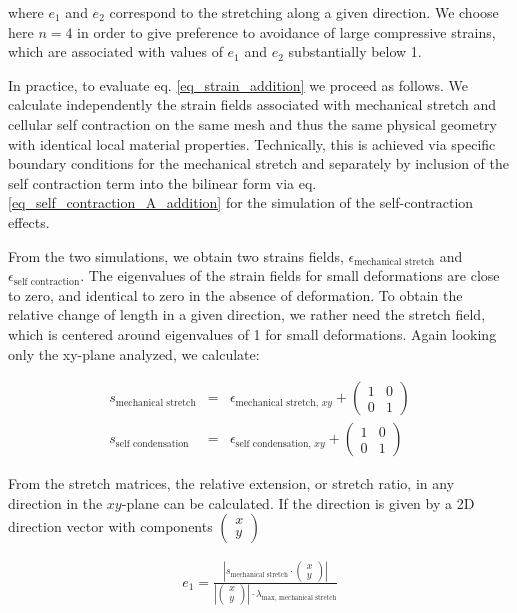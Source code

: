 \documentclass[11pt]{amsart}
\begin{document}
where $e_1$ and $e_2$ correspond to the stretching along a given direction. We choose here $n=4$ in order to give preference to avoidance of large compressive strains, which are associated with values of $e_1$ and $e_2$ substantially below 1.

In practice, to evaluate eq. \ref{eq_strain_addition} we proceed as follows. We calculate independently the strain fields associated with mechanical stretch and cellular self contraction on the same mesh and thus the same physical geometry with identical local material properties. Technically, this is achieved via specific boundary conditions for the mechanical stretch and separately by inclusion of the self contraction term into the bilinear form via eq. \ref{eq_self_contraction_A_addition} for the simulation of the self-contraction effects.

From the two simulations, we obtain two strains fields, $\epsilon_\text{mechanical stretch}$ and  $\epsilon_\text{self contraction}$. The eigenvalues of the strain fields for small deformations are close to zero, and identical to zero in the absence of deformation. To obtain the relative change of length in a given direction, we rather need the stretch field, which is centered around eigenvalues of 1 for small deformations. Again looking only the xy-plane analyzed, we calculate:

\begin{eqnarray}
s_\text{mechanical stretch}&=&\epsilon_{\text{mechanical stretch, }xy}+\left(\begin{matrix}1 &0 \\
0 & 1\end{matrix}\right) \\
s_\text{self condensation}&=&\epsilon_{\text{self condensation, }xy}+\left(\begin{matrix}1 &0 \\
0 & 1\end{matrix}\right)
\end{eqnarray}

From the stretch matrices, the relative extension, or stretch ratio, in any direction in the $xy$-plane can be calculated. If the direction is given by a 2D direction vector with components $ \left( \begin{matrix}x \\ y \end{matrix} \right)$ 

\begin{eqnarray}
e_1=\frac{\left| s_\text{mechanical stretch} \cdot \left( \begin{matrix}x \\ y \end{matrix} \right)\right|}{\left| \left( \begin{matrix}x \\ y \end{matrix} \right)\right| \cdot \lambda_\text{max, mechanical stretch} } \label{eq_d1} 
\end{eqnarray}
\end{document}
